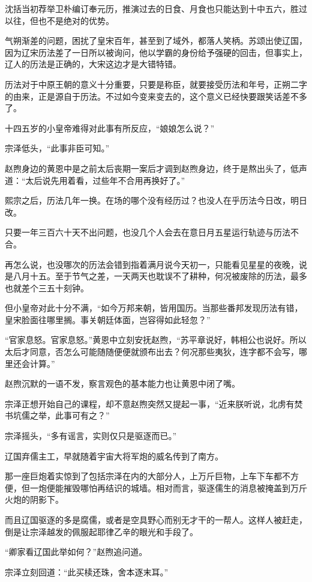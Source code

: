 沈括当初荐举卫朴编订奉元历，推演过去的日食、月食也只能达到十中五六，胜过以往，但也不是绝对的优势。

气朔渐差的问题，困扰了皇宋百年，甚至到了域外，都落人笑柄。苏颂出使辽国，因为辽宋历法差了一日所以被询问，他以学霸的身份给予强硬的回击，但事实上，辽人的历法是正确的，大宋这边才是大错特错。

历法对于中原王朝的意义十分重要，只要是称臣，就要接受历法和年号，正朔二字的由来，正是源自于历法。不过如今变来变去的，这个意义已经快要跟笑话差不多了。

十四五岁的小皇帝难得对此事有所反应，“娘娘怎么说？”

宗泽低头，“此事非臣可知。”

赵煦身边的黄恩中是之前太后丧期一案后才调到赵煦身边，终于是熬出头了，低声道：“太后说先用着看，过些年不合用再换好了。”

熙宗之后，历法几年一换。在场的哪个没有经历过？也没人在乎历法今日改，明日改。

只要一年三百六十天不出问题，也没几个人会去在意日月五星运行轨迹与历法不合。

再怎么说，也没哪次的历法会错到指着满月说今天初一，只能看见星星的夜晚，说是八月十五。至于节气之差，一天两天也耽误不了耕种，何况被废除的历法，最多也就差个三五十刻钟。

但小皇帝对此十分不满，“如今万邦来朝，皆用国历。当那些番邦发现历法有错，皇宋脸面往哪里搁。事关朝廷体面，岂容得如此轻忽？”

“官家息怒。官家息怒。”黄恩中立刻安抚赵煦，“苏平章说好，韩相公也说好。所以太后才同意，否怎么可能随随便便就颁布出去？何况那些夷狄，连字都不会写，哪里还会计算。”

赵煦沉默的一语不发，察言观色的基本能力也让黄恩中闭了嘴。

宗泽正想开始自己的课程，却不意赵煦突然又提起一事，“近来朕听说，北虏有焚书坑儒之举，此事可有之？”

宗泽摇头，“多有谣言，实则仅只是驱逐而已。”

辽国弃儒主工，早就随着宇宙大将军炮的威名传到了南方。

那一座巨炮着实惊到了包括宗泽在内的大部分人，上万斤巨物，上车下车都不方便，但一炮便能摧毁哪怕再结识的城墙。相对而言，驱逐儒生的消息被掩盖到万斤火炮的阴影下。

而且辽国驱逐的多是腐儒，或者是空具野心而别无才干的一帮人。这样人被赶走，倒是让宗泽越发的佩服起耶律乙辛的眼光和手段了。

“卿家看辽国此举如何？”赵煦追问道。

宗泽立刻回道：“此买椟还珠，舍本逐末耳。”

